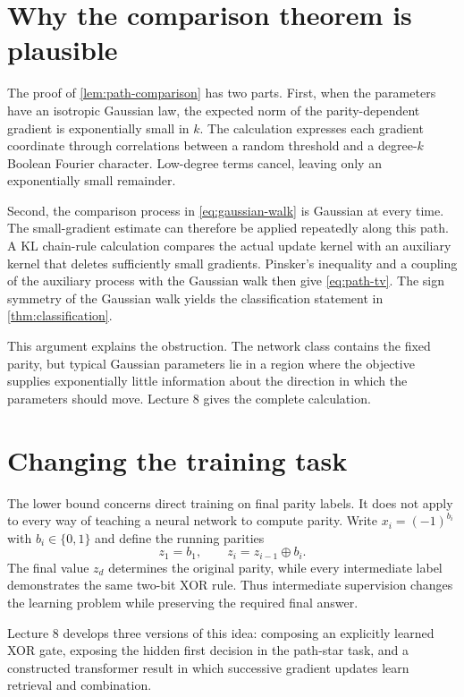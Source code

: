 \documentclass[11pt,twoside]{article}
\theoremstyle{definition}
\theoremstyle{remark}
\begin{document}
\section{Why the comparison theorem is plausible}
\label{sec:proof-roadmap}

The proof of \cref{lem:path-comparison} has two parts. First, when the
parameters have an isotropic Gaussian law, the expected norm of the
parity-dependent gradient is exponentially small in $k$. The calculation
expresses each gradient coordinate through correlations between a random
threshold and a degree-$k$ Boolean Fourier character. Low-degree terms cancel,
leaving only an exponentially small remainder.

Second, the comparison process in \cref{eq:gaussian-walk} is Gaussian at every
time. The small-gradient estimate can therefore be applied repeatedly along
this path. A KL chain-rule calculation compares the actual update kernel with
an auxiliary kernel that deletes sufficiently small gradients. Pinsker's
inequality and a coupling of the auxiliary process with the Gaussian walk then
give \cref{eq:path-tv}. The sign symmetry of the Gaussian walk yields the
classification statement in \cref{thm:classification}.

This argument explains the obstruction. The network class contains the fixed
parity, but typical Gaussian parameters lie in a region where the objective
supplies exponentially little information about the direction in which the
parameters should move. Lecture 8 gives the complete calculation.

\section{Changing the training task}
\label{sec:intermediate-preview}

The lower bound concerns direct training on final parity labels. It does not
apply to every way of teaching a neural network to compute parity. Write
$x_i=(-1)^{b_i}$ with $b_i\in\{0,1\}$ and define the running parities
\[
z_1=b_1,
\qquad
z_i=z_{i-1}\oplus b_i.
\]
The final value $z_d$ determines the original parity, while every intermediate
label demonstrates the same two-bit XOR rule. Thus intermediate supervision
changes the learning problem while preserving the required final answer.

Lecture 8 develops three versions of this idea: composing an explicitly
learned XOR gate, exposing the hidden first decision in the path-star task,
and a constructed transformer result in which successive gradient updates
learn retrieval and combination.
\end{document}
